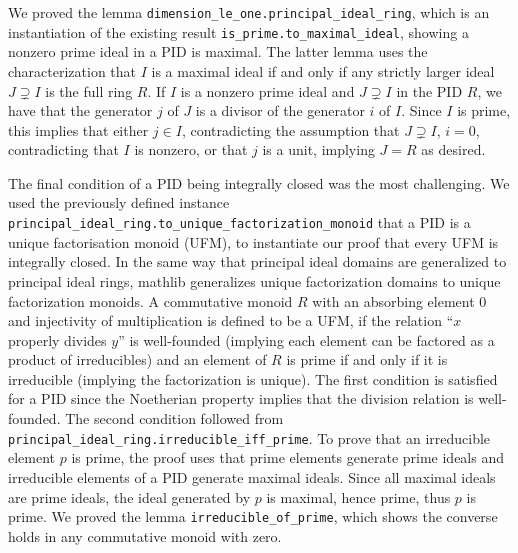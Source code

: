 \documentclass[a4paper,USenglish,cleveref, autoref, thm-restate]{lipics-v2021}
\newcommand{\lean}[1]{\texttt{#1}\xspace} %
\newcommand{\mathlib}{\textsf{mathlib}\xspace}
\begin{document}
We proved the lemma \lean{dimension\_le\_one.principal\_ideal\_ring}, which is an instantiation of the existing result \lean{is\_prime.to\_maximal\_ideal}, showing a nonzero prime ideal in a PID is maximal.
The latter lemma uses the characterization that $I$ is a maximal ideal if and only if any strictly larger ideal $J\supsetneq I$ is the full ring $R$.
If $I$ is a nonzero prime ideal and $J \supsetneq I$ in the PID $R$, we have that the generator $j$ of $J$ is a divisor of the generator $i$ of $I$. Since $I$ is prime, this implies that either $j \in I$, contradicting the assumption that $J \supsetneq I$, $i = 0$, contradicting that $I$ is nonzero, or that $j$ is a unit, implying $J = R$ as desired.

The final condition of a PID being integrally closed was the most challenging.
We used the previously defined instance \lean{principal\_ideal\_ring.to\_unique\_factorization\_monoid} that a PID is a unique factorisation monoid (UFM),
to instantiate our proof that every UFM is integrally closed.
In the same way that principal ideal domains are generalized to principal ideal rings, \mathlib generalizes unique factorization domains to unique factorization monoids.
A commutative monoid $R$ with an absorbing element $0$ and injectivity of multiplication is defined to be a UFM,
if the relation ``$x$ properly divides $y$'' is well-founded (implying each element can be factored as a product of irreducibles) and
an element of $R$ is prime if and only if it is irreducible (implying the factorization is unique).
The first condition is satisfied for a PID since the Noetherian property implies that the division relation is well-founded.
The second condition followed from \lean{principal\_ideal\_ring.irreducible\_iff\_prime}.
To prove that an irreducible element $p$ is prime, the proof uses that prime elements generate prime ideals and irreducible elements of a PID generate maximal ideals. Since all maximal ideals are prime ideals, the ideal generated by $p$ is maximal, hence prime, thus $p$ is prime.
We proved the lemma \lean{irreducible\_of\_prime}, which shows the converse holds in any commutative monoid with zero.
\end{document}
